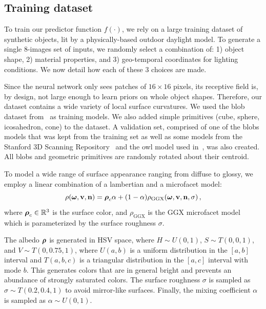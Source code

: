 \subsection{Training dataset}
\label{sec:training_dataset}

To train our predictor function $f(\cdot)$, we rely on a large training dataset of synthetic objects, lit by a physically-based outdoor daylight model. To generate a single 8-images set of inputs, we randomly select a combination of: 1) object shape, 2) material properties, and 3) geo-temporal coordinates for lighting conditions. We now detail how each of these 3 choices are made. 

Since the neural network only sees patches of $16 \times 16$ pixels, its receptive field is, by design, not large enough to learn priors on whole object shapes. Therefore, our dataset contains a wide variety of local surface curvatures. We used the blob dataset from~\cite{johnson-cvpr-11} as training models. We also added simple  primitives (cube, sphere, icosahedron, cone) to the dataset. A validation set, comprised of one of the blobs models that was kept from the training set as well as some models from the Stanford 3D Scanning Repository~\cite{curless-cg-96} and the owl model used in~\cite{holdgeoffroy-iccp-15}, was also created. All blobs and geometric primitives are randomly rotated about their centroid. 


To model a wide range of surface appearance ranging from diffuse to glossy, we employ a linear combination of a lambertian and a microfacet model: 
%
\begin{equation}
\rho(\boldsymbol \omega, {\bf v}, {\bf n}) = \boldsymbol \rho_c \alpha + (1-\alpha)\rho_\text{GGX}(\boldsymbol \omega, {\bf v}, {\bf n}, \sigma) \,,
\label{eq:brdf}
\end{equation}
%
where $\boldsymbol \rho_c \in \mathbb{R}^3$ is the surface color, and $\rho_\text{GGX}$ is the GGX microfacet model~\cite{walter-eg-07} which is parameterized by the surface roughness $\sigma$. 

The albedo $\boldsymbol \rho$ is generated in HSV space, where $H \sim U(0,1)$, $S \sim T(0, 0, 1)$, and $V \sim T(0, 0.75, 1)$, where $U(a, b)$ is a uniform distribution in the $[a, b]$ interval and $T(a,b,c)$ is a triangular distribution in the $[a,c]$ interval with mode $b$. This generates colors that are in general bright and prevents an abundance of strongly saturated colors. The surface roughness $\sigma$ is sampled as $\sigma \sim T(0.2, 0.4, 1)$ to avoid mirror-like surfaces. Finally, the mixing coefficient $\alpha$ is sampled as $\alpha \sim U(0,1)$. 

